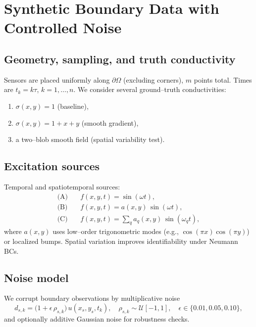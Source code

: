 \documentclass[11pt,a4paper]{article}
\numberwithin{equation}{section}
\begin{document}
\section{Synthetic Boundary Data with Controlled Noise}
\label{sec:data}

\subsection{Geometry, sampling, and truth conductivity}
Sensors are placed uniformly along $\partial\Omega$ (excluding corners), $m$ points total. Times are $t_k=k\tau$, $k=1,\dots,n$.
We consider several ground--truth conductivities:
\begin{enumerate}[leftmargin=1.25em]
  \item $\sigma(x,y)=1$ (baseline),
  \item $\sigma(x,y)=1+x+y$ (smooth gradient),
  \item a two--blob smooth field (spatial variability test).
\end{enumerate}

\subsection{Excitation sources}
Temporal and spatiotemporal sources:
\begin{align}
  \text{(A)}\quad & f(x,y,t)=\sin(\omega t),\\[0.25em]
  \text{(B)}\quad & f(x,y,t)=a(x,y)\,\sin(\omega t),\\[0.25em]
  \text{(C)}\quad & f(x,y,t)=\sum_{q} a_q(x,y)\,\sin(\omega_q t),
\end{align}
where $a(x,y)$ uses low--order trigonometric modes (e.g., $\cos(\pi x)\cos(\pi y)$) or localized bumps.
Spatial variation improves identifiability under Neumann BCs.

\subsection{Noise model}
We corrupt boundary observations by multiplicative noise
\begin{equation}
  d_{s,k} = \big(1+\epsilon\,\rho_{s,k}\big)\,u(x_s,y_s,t_k), 
  \quad \rho_{s,k}\sim\mathcal{U}[-1,1], 
  \quad \epsilon\in\{0.01,0.05,0.10\},
\end{equation}
and optionally additive Gaussian noise for robustness checks.

\end{document}
